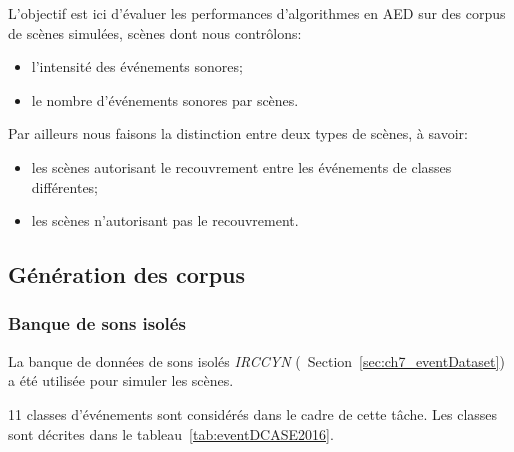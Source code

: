 L'objectif est ici d'évaluer les performances d'algorithmes en AED sur des corpus de scènes simulées, scènes dont nous contrôlons:

\begin{itemize}
\item l'intensité des événements sonores;
\item le nombre d'événements sonores par scènes.
\end{itemize}

Par ailleurs nous faisons la distinction entre deux types de scènes, à savoir:

\begin{itemize}
\item les scènes autorisant le recouvrement entre les événements de classes différentes;
\item les scènes n'autorisant pas le recouvrement.
\end{itemize}

\subsection{Génération des corpus}

\subsubsection{Banque de sons isolés}

La banque de données de sons isolés \emph{IRCCYN} (\cf~Section~\ref{sec:ch7_eventDataset}) a été utilisée pour simuler les scènes.

11 classes d'événements sont considérés dans le cadre de cette tâche. Les classes sont décrites dans le tableau~\ref{tab:eventDCASE2016}.

